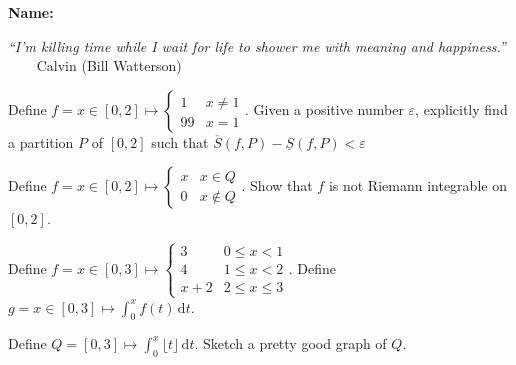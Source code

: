 \documentclass[12pt,fleqn,answers]{exam}
\begin{document}
\large
\vspace{0.1in}
\noindent{}
{\bf Name:}  \\
\noindent {}
\vspace{0.1in}

\noindent \emph{“I'm killing time while I wait for life to shower me 
with meaning and happiness.”} \\ $\phantom{xxx}$ \hfill  {\sc Calvin (Bill Watterson)}




\vspace{0.1in}


\begin{questions}

 \question Define $f = x \in [0,2] \mapsto \begin{cases} 
    1 & x \neq 1 \\ 99 & x = 1 \end{cases}$. Given a positive
    number $\varepsilon$, explicitly find a partition $P$ of $[0,2]$ such
    that $\overline{S}(f,P)-\underline{S}(f,P)< \varepsilon$

    \question Define $f = x \in [0,2] \mapsto \begin{cases} 
        x & x \in Q  \\ 0 & x \not \in Q \end{cases}$. Show 
        that $f$ is not Riemann integrable on $[0,2]$.

    \question Define $f = x \in[0,3] \mapsto \begin{cases} 3 &  
        0 \leq x < 1 \\ 4 & 1 \leq x < 2 \\ x+2 & 2 \leq x \leq 3   
    \end{cases}$.  Define $ g = x \in [0,3] \mapsto \int_0^x f(t) \, 
    \mathrm{d} t$. 


   \question Define $Q = [0,3] \mapsto \int_0^x 
   \lfloor t \rfloor \, \mathrm{d} t$. Sketch 
   a pretty good graph of $Q$.


\end{questions}
\end{document}

